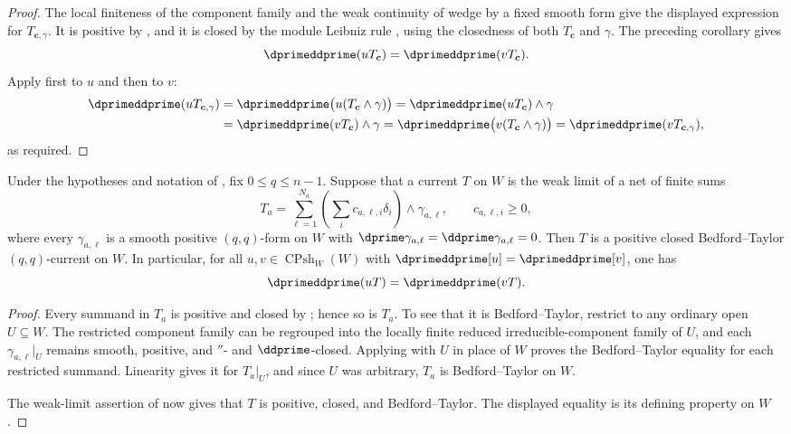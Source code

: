 \begin{proof}
The local finiteness of the component family and the weak continuity of
wedge by a fixed smooth form give the displayed expression for
$T_{\boldsymbol c,\gamma}$.  It is positive by
, and it is closed by the module
Leibniz rule , using the closedness of both
$T_{\boldsymbol c}$ and $\gamma$.  The preceding corollary gives
\[
 \dprimeddprime(uT_{\boldsymbol c})
 =\dprimeddprime(vT_{\boldsymbol c}).
\]
Apply  first to $u$ and then to $v$:
\[
 \begin{aligned}
 \dprimeddprime(uT_{\boldsymbol c,\gamma})
 &=\dprimeddprime\bigl(u(T_{\boldsymbol c}\wedge\gamma)\bigr)
   =\dprimeddprime(uT_{\boldsymbol c})\wedge\gamma\\
 &=\dprimeddprime(vT_{\boldsymbol c})\wedge\gamma
   =\dprimeddprime\bigl(v(T_{\boldsymbol c}\wedge\gamma)\bigr)
   =\dprimeddprime(vT_{\boldsymbol c,\gamma}),
 \end{aligned}
\]
as required.
\end{proof}

\begin{corollary}
\label{cor:ch16-cpsh-weak-component-current}
Under the hypotheses and notation of
, fix
$0\leq q\leq n-1$.  Suppose that a current $T$ on $W$ is the weak
limit of a net of finite sums
\[
 T_a=
 \sum_{\ell=1}^{N_a}
 \left(\sum_i c_{a,\ell,i}\delta_i\right)\wedge\gamma_{a,\ell},
 \qquad c_{a,\ell,i}\geq0,
\]
where every $\gamma_{a,\ell}$ is a smooth positive $(q,q)$-form on
$W$ with
$\dprime\gamma_{a,\ell}=\ddprime\gamma_{a,\ell}=0$.  Then $T$ is a
positive closed Bedford--Taylor $(q,q)$-current on $W$.  In particular,
for all $u,v\in\operatorname{CPsh}_W(W)$ with
$\dprimeddprime[u]=\dprimeddprime[v]$, one has
\[
                         \dprimeddprime(uT)=\dprimeddprime(vT).
\]
\end{corollary}

\begin{proof}
Every summand in $T_a$ is positive and closed by
; hence so is $T_a$.
To see that it is Bedford--Taylor, restrict to any ordinary open
$U\subseteq W$.  The restricted component family can be regrouped into
the locally finite reduced irreducible-component family of $U$, and each
$\gamma_{a,\ell}|_U$ remains smooth, positive, and
$\dprime$- and $\ddprime$-closed.  Applying
 with $U$ in place of
$W$ proves the Bedford--Taylor equality for each restricted summand.
Linearity gives it for $T_a|_U$, and since $U$ was arbitrary, $T_a$
is Bedford--Taylor on $W$.

The weak-limit assertion of  now gives that
$T$ is positive, closed, and Bedford--Taylor.  The displayed equality is
its defining property on $W$.
\end{proof}

